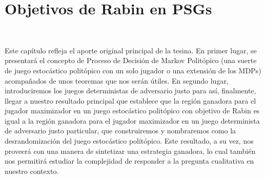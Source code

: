 \chapter{Objetivos de Rabin en PSGs}
~\label{cap:results}
\vspace{-1cm}

Este capítulo refleja el aporte original principal de la tesina. En primer
lugar, se presentará el concepto de Proceso de Decisión de Markov Politópico
(una suerte de juego estocástico politópico con un solo jugador o una extensión
de los MDPs) acompañados de unos teoremas que nos serán útiles. En segundo
lugar, introduciremos los juegos deterministas de adversario justo para así,
finalmente, llegar a nuestro resultado principal que establece que la región
ganadora para el jugador maximizador en un juego estocástico politópico con
objetivo de Rabin es igual a la región ganadora para el jugador maximizador en
un juego determinista de adversario justo particular, que construiremos y
nombraremos como la desrandomización del juego estocástico politópico. Este
resultado, a su vez, nos proveerá con una manera de sintetizar una estrategia
ganadora, lo cual también nos permitirá estudiar la complejidad de responder a
la pregunta cualitativa en nuestro contexto.




